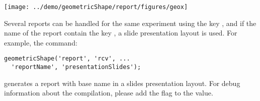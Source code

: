 \begin{marginfigure}
\texttt{[image: ../demo/geometricShape/report/figures/geox]}
\end{marginfigure}


Several reports can be handled for the same experiment using the key , and if the name of the report contain the key , a slide presentation layout is used. For example, the command:
\begin{lstlisting}
geometricShape('report', 'rcv', ...
  'reportName', 'presentationSlides');
\end{lstlisting}
generates a report with base name  in a slides presentation layout. For debug information about the compilation, please add the  flag to the  value.
